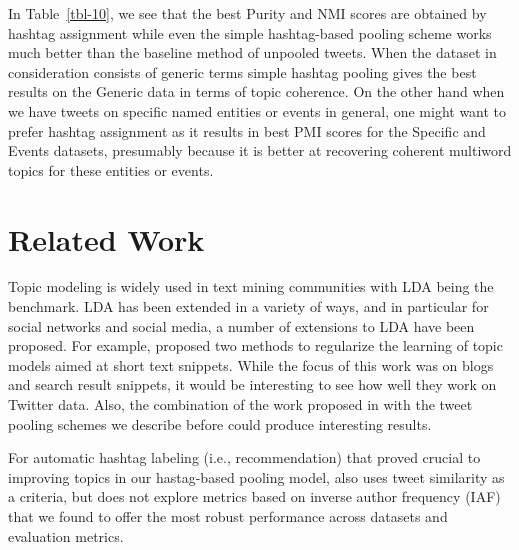 \documentclass[10pt,a5paper,twoside]{article}
\begin{document}
In Table~\ref{tbl-10}, we see that the best Purity and NMI scores are
obtained by hashtag assignment while even the simple hashtag-based
pooling scheme works much better than the baseline method of unpooled
tweets. When the dataset in consideration consists of generic terms
simple hashtag pooling gives the best results on the Generic data in
terms of topic coherence. On the other hand when we have tweets on
specific named entities or events in general, one might want to prefer
hashtag assignment as it results in best PMI scores for the Specific
and Events datasets, presumably because it is better at recovering
coherent multiword topics for these entities or events.

\section{Related Work}

\label{sec:related_work}

Topic modeling is widely used in text mining communities with LDA
being the benchmark.  LDA has been extended in a variety of ways, and
in particular for social networks and social media, a number of
extensions to LDA have been proposed.  For example, \cite{newman11}
proposed two methods to regularize the learning of topic models aimed
at short text snippets. While the focus of this work was on blogs and
search result snippets, it would be interesting to see how well they
work on Twitter data.  Also, the combination of the work proposed in
\cite{newman11} with the tweet pooling schemes we describe before
could produce interesting results.


For automatic hashtag labeling (i.e., recommendation) that proved
crucial to improving topics in our hastag-based pooling model,
\cite{zangerle2011recommending} also uses tweet similarity as a
criteria, but does not explore metrics based on inverse author
frequency (IAF)~\cite{iaf} that we found to offer the most robust
performance across datasets and evaluation metrics.


\end{document}
